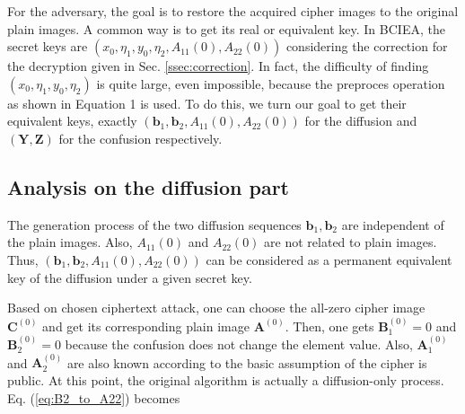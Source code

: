 \documentclass[final,3p,times,twocolumn]{elsarticle}
\begin{document}
For the adversary, the goal is to restore the acquired cipher images to the original plain images. A common way is to get its real or equivalent key. In BCIEA, the secret keys are $(x_0,\eta_1,y_0,\eta_2,A_{11}(0),A_{22}(0))$ considering the correction for the decryption given in Sec. \ref{ssec:correction}. 
In fact, the difficulty of finding $(x_0,\eta_1,y_0,\eta_2)$ is quite large, even impossible, because the preproces operation as shown in Equation 1 is used. To do this, we turn our goal to get their equivalent keys, exactly $(\bm{b}_1,\bm{b}_2,A_{11}(0),A_{22}(0))$ for the diffusion and $(\bm{Y},\bm{Z})$ for the confusion respectively.



\subsection{Analysis on the diffusion part}
\label{ssec:break_diffusion}
The generation process of the two diffusion sequences $\bm{b}_1,\bm{b}_2$ are independent of the plain images. Also, $A_{11}(0)$ and $A_{22}(0)$ are not related to plain images. Thus, $(\bm{b}_1,\bm{b}_2,A_{11}(0),A_{22}(0))$ can be considered as a permanent equivalent key of the diffusion under a given secret key. 


Based on chosen ciphertext attack, one can choose the all-zero cipher image $\bm{C}^{(0)}$ and get its corresponding plain image $\bm{A}^{(0)}$. Then, one gets $\bm{B}_1^{(0)}=0$ and $\bm{B}_2^{(0)}=0$ because the confusion does not change the element value. Also, $\bm{A}_1^{(0)}$ and $\bm{A}_2^{(0)}$ are also known according to the basic assumption of the cipher is public. At this point, the original algorithm is actually a diffusion-only process.
Eq. (\ref{eq:B2_to_A22}) becomes
\end{document}

